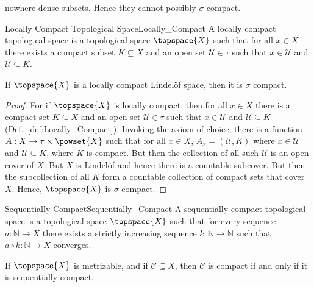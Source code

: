 \documentclass{article}                                                        %
\begin{document}
        nowhere dense subsets. Hence they cannot possibly $\sigma$ compact.
        \begin{fdefinition}{Locally Compact Topological Space}{Locally_Compact}
            A locally compact topological space is a topological space
            $\topspace{X}$ such that for all $x\in{X}$ there exists a compact
            subset $K\subseteq{X}$ and an open set $\mathcal{U}\in\tau$ such
            that $x\in\mathcal{U}$ and $\mathcal{U}\subseteq{K}$.
        \end{fdefinition}
        \begin{theorem}
            \label{thm:Loc_Comp_and_Lindelof_Implies_Sigma_Comp}%
            If $\topspace{X}$ is a locally compact Lindel\"{o}f space, then it
            is $\sigma$ compact.
        \end{theorem}
        \begin{proof}
            For if $\topspace{X}$ is locally compact, then for all $x\in{X}$
            there is a compact set $K\subseteq{X}$ and an open set
            $\mathcal{U}\in\tau$ such that $x\in\mathcal{U}$ and
            $\mathcal{U}\subseteq{K}$ (Def.~\ref{def:Locally_Compact}). Invoking
            the axiom of choice, there is a function
            $A:X\rightarrow\tau\times\powset{X}$ such that for all $x\in{X}$,
            $A_{x}=(\mathcal{U},K)$ where $x\in\mathcal{U}$ and
            $\mathcal{U}\subseteq{K}$, where $K$ is compact. But then the
            collection of all such $\mathcal{U}$ is an open cover of $X$. But
            $X$ is Lindel\"{o}f and hence there is a countable subcover. But
            then the subcollection of all $K$ form a countable collection of
            compact sets that cover $X$. Hence, $\topspace{X}$ is $\sigma$
            compact.
        \end{proof}
        \begin{fdefinition}{Sequentially Compact}{Sequentially_Compact}
            A sequentially compact topological space is a topological space
            $\topspace{X}$ such that for every sequence
            $a:\mathbb{N}\rightarrow{X}$ there exists a strictly increasing
            sequence $k:\mathbb{N}\rightarrow\mathbb{N}$ such that
            $a\circ{k}:\mathbb{N}\rightarrow{X}$ converges.
        \end{fdefinition}
        \begin{theorem}
            \label{thm:Met_Space_Seq_Compact_iff_Compact}%
            If $\topspace{X}$ is metrizable, and if $\mathcal{C}\subseteq{X}$,
            then $\mathcal{C}$ is compact if and only if it is sequentially
            compact.
        \end{theorem}
\end{document}
